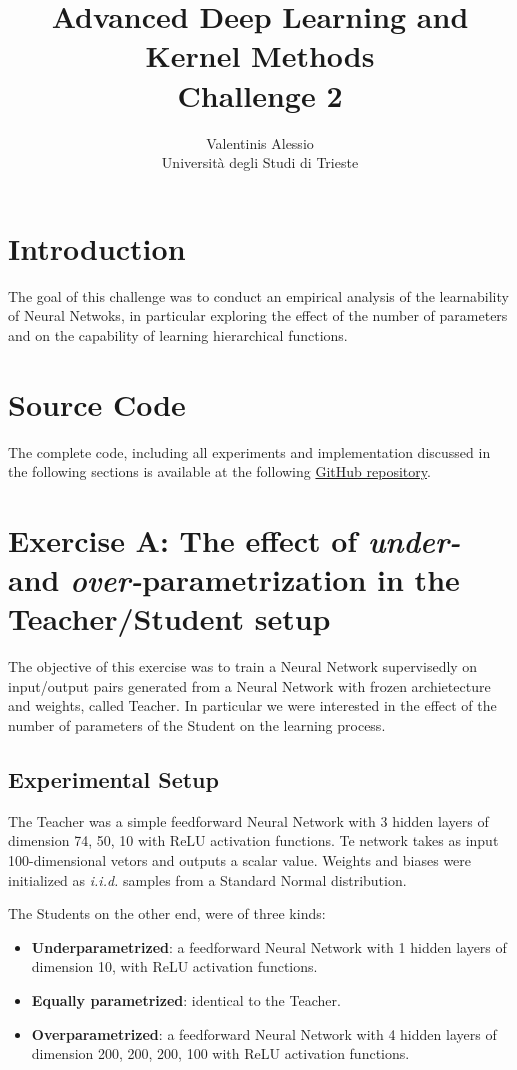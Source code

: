 \documentclass[a4paper, 10pt]{article}
\title{Advanced Deep Learning and Kernel Methods \\ Challenge 2}
\author{Valentinis Alessio\\Università degli Studi di Trieste}
\date{}
\begin{document}
\maketitle

\section{Introduction}
The goal of this challenge was to conduct an empirical analysis of the learnability of Neural Netwoks, in particular exploring the effect of the number of parameters
and on the capability of learning hierarchical functions.

\section{Source Code}
The complete code, including all experiments and implementation discussed in the following sections
is available at the following \href{https://github.com/ValentinisAlessio/Adv_DL_challenges}{GitHub repository}.

\section{Exercise A: The effect of \textit{under-} and \textit{over-}parametrization in the Teacher/Student setup}
The objective of this exercise was to train a Neural Network supervisedly on input/output pairs generated from a Neural Network with frozen archietecture and 
weights, called Teacher. In particular we were interested in the effect of the number of parameters of the Student on the learning process.

\subsection{Experimental Setup}
The Teacher was a simple feedforward Neural Network with 3 hidden layers of dimension 74, 50, 10 with ReLU activation functions. Te network takes as input 100-dimensional 
vetors and outputs a scalar value. Weights and biases were initialized as \textit{i.i.d.} samples from a Standard Normal distribution.

The Students on the other end, were of three kinds:
\begin{itemize}
    \item \textbf{Underparametrized}: a feedforward Neural Network with 1 hidden layers of dimension 10, with ReLU activation functions.
    \item \textbf{Equally parametrized}: identical to the Teacher.
    \item \textbf{Overparametrized}: a feedforward Neural Network with 4 hidden layers of dimension 200, 200, 200, 100 with ReLU activation functions.    
\end{itemize}
\end{document}
